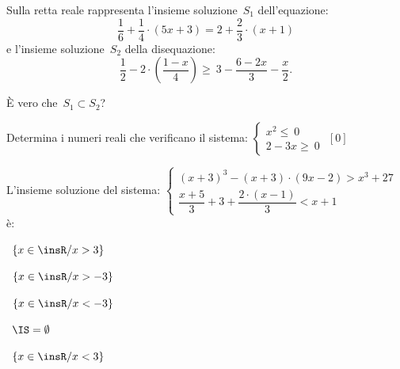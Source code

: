 \begin{esercizio}
 \label{ese:21.33}
Sulla retta reale rappresenta l'insieme soluzione~\(S_{1}\)
dell'equazione:
\[\dfrac{1}{6}+\dfrac{1}{4}\cdot (5x+3)=2+\dfrac{2}{3}\cdot (x+1)\]
e l'insieme soluzione~\(S_{2}\) della disequazione:
\[\dfrac{1}{2}-2\cdot\left(\dfrac{1-x}{4}\right)\ge
~3-\dfrac{6-2x}{3}-\dfrac{x}{2}.\]

È vero che~\(S_{1}\subset S_{2}\)?
\end{esercizio}

\begin{esercizio}[\Ast]
 \label{ese:21.34}
 Determina i numeri reali che verificano il sistema:
 \(\left\{%
  \begin{array}{l}
  x^{2}\le~0
  \\2-3x\ge~0
 \end{array}\right.\)
 \hfill \(\left[0\right]\)
 \end{esercizio}

\begin{esercizio}
 \label{ese:21.35}
 L'insieme soluzione del sistema:
\(\left\{\begin{array}{l}
  (x+3)^{3}-(x+3)\cdot (9x-2)>x^{3}+27\\
  \dfrac{x+5}{3}+3+\dfrac{2\cdot (x-1)}{3}<x+1
 \end{array}\right.\) è:
\begin{multicols}{2}
\boxA\quad~\(\left\{x\in \insR/x>3\right\}\)

\boxB\quad~\(\left\{x\in \insR/x>-3\right\}\)

\boxC\quad~\(\left\{x\in \insR/x<-3\right\}\)

\boxD\quad~\(\IS=\emptyset \)

\boxE\quad~\(\left\{x\in\insR/x<3\right\}\)
\end{multicols}

\end{esercizio}

